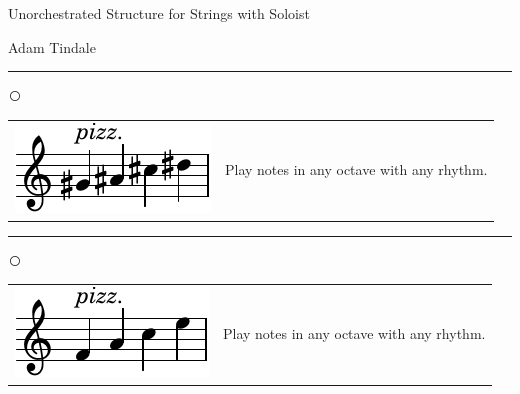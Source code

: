 \documentclass[12pt]{article}
\begin{document}
\begin{center}
{\Huge Unorchestrated Structure for Strings with Soloist}
\end{center}

\vspace{0.2cm}

\begin{flushright}
Adam Tindale
\end{flushright}

\vspace{0.3cm}

\hrule

\vspace{0.1cm}

\textcircled{}

\begin{tabular}{l l}
\begin{minipage}{0.5\textwidth}
\includegraphics[scale=1.5]{gacdpizz.pdf}
\end{minipage}
&
\begin{minipage}{0.5\textwidth}
Play notes in any octave with any rhythm.
\end{minipage}
\end{tabular}

\vspace{0.3cm}

\hrule

\vspace{0.1cm}

\textcircled{}


\begin{tabular}{l l}
\begin{minipage}{0.5\textwidth}
\includegraphics[scale=1.5]{facepizz.pdf} 
\end{minipage}
&
\begin{minipage}{0.5\textwidth}
Play notes in any octave with any rhythm.
\end{minipage}
\end{tabular}
\end{document}
